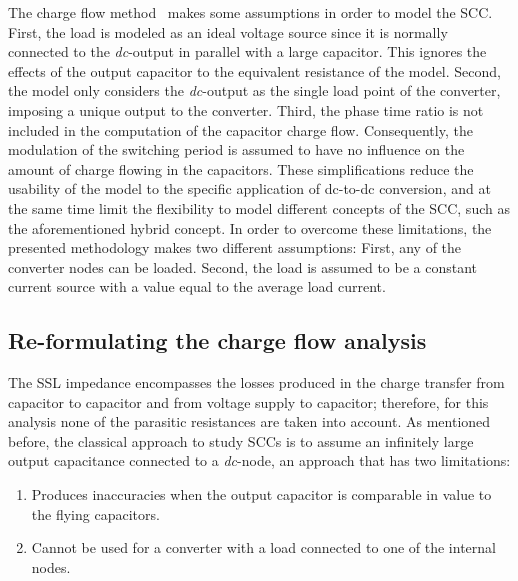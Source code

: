 The charge flow method~\cite{95Makowski} makes some assumptions in order to model the SCC. First, the load is modeled as an ideal voltage source since it is normally connected to the \emph{dc}-output in parallel with a large capacitor. This ignores the effects of the output capacitor to the equivalent resistance of the model. Second, the model only considers the \emph{dc}-output as the single load point of the converter, imposing a unique output to the converter. Third, the phase time ratio is not included in the computation of the capacitor charge flow. Consequently, the modulation of the switching period is assumed to have no influence on the amount of charge flowing in the capacitors. These simplifications reduce the usability of the model to the specific application of dc-to-dc conversion, and at the same time limit the flexibility to model different concepts of the SCC, such as the aforementioned hybrid concept. In order to overcome these limitations, the presented methodology makes two different assumptions: First, any of the converter nodes can be loaded. Second, the load is assumed to be a constant current source with a value equal to the average load current.\\


\subsection{Re-formulating the charge flow analysis}

The SSL impedance encompasses the losses produced in the charge transfer from capacitor to capacitor and from voltage supply to capacitor; therefore, for this analysis none of the parasitic resistances are taken into account. As mentioned before, the classical approach to study SCCs is to assume an infinitely large output capacitance connected to a \emph{dc}-node, an approach that has two limitations:
\begin{enumerate}
   \item Produces inaccuracies when the output capacitor is comparable in value to the flying capacitors.
   \item Cannot be used for a converter with a load connected to one of the internal nodes.
\end{enumerate}


